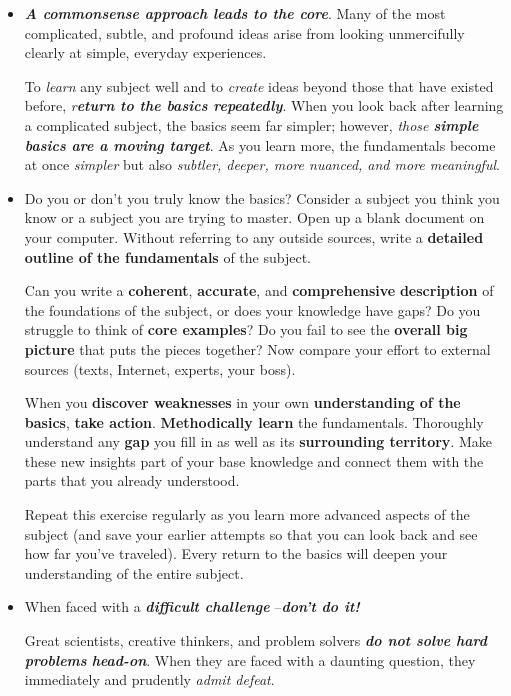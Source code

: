 \documentclass[11pt]{article}
\begin{document}
\begin{itemize}
\item \emph{\textbf{A commonsense approach leads to the core}}. Many of the most complicated, subtle, and profound ideas arise from looking unmercifully clearly at simple, everyday experiences. 

To \emph{learn} any subject well and to \emph{create} ideas beyond those that have existed before, \emph{r\textbf{eturn to the basics repeatedly}}. When you look back after learning a complicated subject, the basics seem far simpler; however, \emph{those \textbf{simple basics are a moving target}}. As you learn more, the fundamentals become at once \emph{simpler} but also \emph{subtler, deeper, more nuanced, and more meaningful}. 

\item 
\begin{exercise}
Do you or don’t you truly know the basics? Consider a subject you think you know or a subject you are trying to master.  Open up a blank document on your computer. Without referring to any outside sources, write a \textbf{detailed outline of the fundamentals} of the subject.

Can you write a \textbf{coherent}, \textbf{accurate}, and \textbf{comprehensive} \textbf{description} of the foundations of the subject, or does your knowledge have gaps? Do you struggle to think of \textbf{core examples}? Do you fail to see the \textbf{overall big picture} that puts the pieces together? Now compare your effort to external sources (texts, Internet, experts, your boss).

When you \textbf{discover weaknesses} in your own \textbf{understanding of the basics}, \textbf{take action}. \textbf{Methodically learn} the fundamentals. Thoroughly understand any \textbf{gap} you fill in as well as its \textbf{surrounding territory}. Make these new insights part of your base knowledge and connect them with the parts that you already understood. 

Repeat this exercise regularly as you learn more advanced aspects of the subject (and save your earlier attempts so that you can look back and see how far you’ve traveled). Every return to the basics will deepen your understanding of the entire subject.
\end{exercise}

\item When faced with a \emph{\textbf{difficult challenge}} --\emph{\textbf{don’t do it!}}

Great scientists, creative thinkers, and problem solvers \emph{\textbf{do not solve hard problems} \textbf{head-on}}. When they are faced with a daunting question, they immediately and prudently \emph{admit defeat}. 


\end{itemize}
\end{document}
